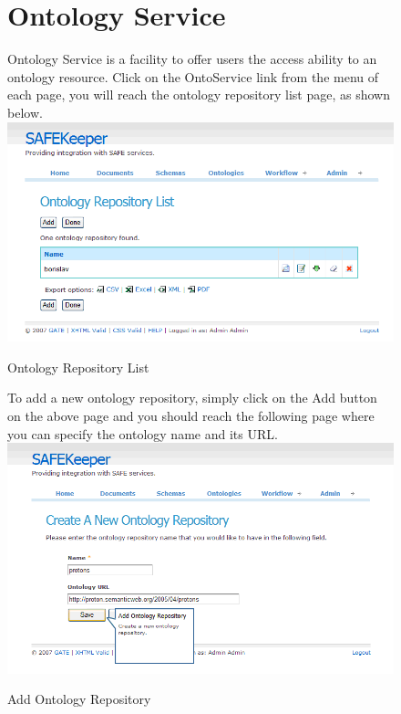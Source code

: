 \begin{figure}
\section{Ontology Service}
Ontology Service is a facility to offer users the access ability to 
an ontology resource. Click on the OntoService link from the menu of 
each page, you will reach the ontology repository list page, as shown 
below.
\newline
\newline
\includegraphics[scale=0.4]{ontorepolist}
\caption{Ontology Repository List}
\label{fig:ontorepolist}
\end{figure}

\begin{figure}
To add a new ontology repository, simply click on the Add button on 
the above page and you should reach the following page where you can 
specify the ontology name and its URL.
\newline
\newline
\includegraphics[scale=0.4]{addontorepo}
\caption{Add Ontology Repository}
\label{fig:addontorepo}
\end{figure}

